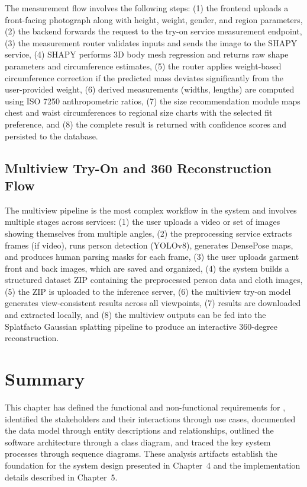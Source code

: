 The measurement flow involves the following steps: (1) the frontend uploads a front-facing photograph along with height, weight, gender, and region parameters, (2) the backend forwards the request to the try-on service measurement endpoint, (3) the measurement router validates inputs and sends the image to the SHAPY service, (4) SHAPY performs 3D body mesh regression and returns raw shape parameters and circumference estimates, (5) the router applies weight-based circumference correction if the predicted mass deviates significantly from the user-provided weight, (6) derived measurements (widths, lengths) are computed using ISO 7250 anthropometric ratios, (7) the size recommendation module maps chest and waist circumferences to regional size charts with the selected fit preference, and (8) the complete result is returned with confidence scores and persisted to the database.

\subsection{Multiview Try-On and 360 Reconstruction Flow}

The multiview pipeline is the most complex workflow in the system and involves multiple stages across services: (1) the user uploads a video or set of images showing themselves from multiple angles, (2) the preprocessing service extracts frames (if video), runs person detection (YOLOv8), generates DensePose maps, and produces human parsing masks for each frame, (3) the user uploads garment front and back images, which are saved and organized, (4) the system builds a structured dataset ZIP containing the preprocessed person data and cloth images, (5) the ZIP is uploaded to the inference server, (6) the multiview try-on model generates view-consistent results across all viewpoints, (7) results are downloaded and extracted locally, and (8) the multiview outputs can be fed into the Splatfacto Gaussian splatting pipeline to produce an interactive 360-degree reconstruction.

\section{Summary}
This chapter has defined the functional and non-functional requirements for \projectname, identified the stakeholders and their interactions through use cases, documented the data model through entity descriptions and relationships, outlined the software architecture through a class diagram, and traced the key system processes through sequence diagrams. These analysis artifacts establish the foundation for the system design presented in Chapter~4 and the implementation details described in Chapter~5.
